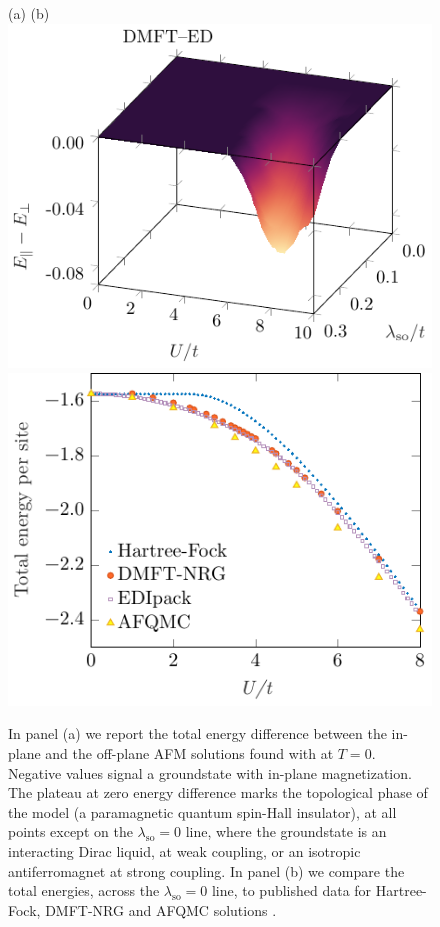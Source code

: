 \documentclass[edipack_sp.tex]{subfiles}
\begin{document}
\begin{figure}
\hspace{1cm} (a) \hspace{7.25cm} (b)\\
    \includegraphics[width=0.47\linewidth,trim={0 0 0 5mm},clip]{figures/KMH_energy.pdf}\hfill
    \includegraphics[width=0.45\linewidth]{figures/benchEnergy_honey.pdf}\\
    \caption{In panel (a) we report the total energy difference between 
    the in-plane and the
    off-plane AFM solutions found with \NAME at $T=0$. Negative values
    signal a groundstate with in-plane magnetization. The plateau at zero
    energy difference marks the topological phase of the model (a 
    paramagnetic quantum spin-Hall insulator), at all points except on the $\lambda_\mathrm{so}=0$ line, where the groundstate is an interacting
    Dirac liquid, at weak coupling, or an isotropic antiferromagnet at strong coupling. In panel (b) we compare the total energies, across the 
    $\lambda_\mathrm{so}=0$ line, to published data for Hartree-Fock,
    DMFT-NRG and AFQMC solutions \cite{Racz2020}.}
    \label{fig:KMenergy}
\end{figure}
\end{document}
